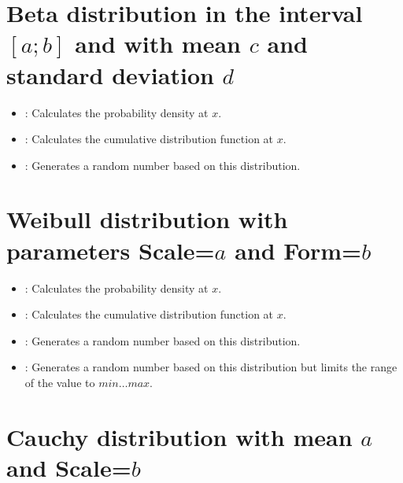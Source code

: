 \section{Beta distribution in the interval \texorpdfstring{$[a;b]$}{[a;b]} and with mean \texorpdfstring{$c$}{c} and standard deviation \texorpdfstring{$d$}{d}}

\begin{itemize}

\item
{}:
Calculates the probability density at $x$.

\item
{}:
Calculates the cumulative distribution function at $x$.

\item
{}:
Generates a random number based on this distribution.

\end{itemize}



\section{Weibull distribution with parameters Scale=\texorpdfstring{$a$}{a} and Form=\texorpdfstring{$b$}{b}}

\begin{itemize}

\item
{}:
Calculates the probability density at $x$.

\item
{}:
Calculates the cumulative distribution function at $x$.

\item
{}:
Generates a random number based on this distribution.

\item
{}:
Generates a random number based on this distribution but limits the range of the value to $min\ldots max$.

\end{itemize}



\section{Cauchy distribution with mean \texorpdfstring{$a$}{a} and Scale=\texorpdfstring{$b$}{b}}

